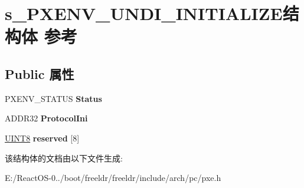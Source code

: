\hypertarget{structs___p_x_e_n_v___u_n_d_i___i_n_i_t_i_a_l_i_z_e}{}\section{s\+\_\+\+P\+X\+E\+N\+V\+\_\+\+U\+N\+D\+I\+\_\+\+I\+N\+I\+T\+I\+A\+L\+I\+Z\+E结构体 参考}
\label{structs___p_x_e_n_v___u_n_d_i___i_n_i_t_i_a_l_i_z_e}
\subsection*{Public 属性}
\begin{DoxyCompactItemize}
\item 
\mbox{\label{structs___p_x_e_n_v___u_n_d_i___i_n_i_t_i_a_l_i_z_e_ae84b1b113e8902d219699cc5dd27d95a}} 
P\+X\+E\+N\+V\+\_\+\+S\+T\+A\+T\+US {\bfseries Status}
\item 
\mbox{\label{structs___p_x_e_n_v___u_n_d_i___i_n_i_t_i_a_l_i_z_e_a67021bb3a2cd30bc29819a98811b7060}} 
A\+D\+D\+R32 {\bfseries Protocol\+Ini}
\item 
\mbox{\label{structs___p_x_e_n_v___u_n_d_i___i_n_i_t_i_a_l_i_z_e_a34c2692951e2f0aeaf3c607854e5d4bd}} 
\hyperlink{_processor_bind_8h_ab27e9918b538ce9d8ca692479b375b6a}{U\+I\+N\+T8} {\bfseries reserved} \mbox{[}8\mbox{]}
\end{DoxyCompactItemize}


该结构体的文档由以下文件生成\+:\begin{DoxyCompactItemize}
\item 
E\+:/\+React\+O\+S-\/0../boot/freeldr/freeldr/include/arch/pc/pxe.\+h\end{DoxyCompactItemize}
